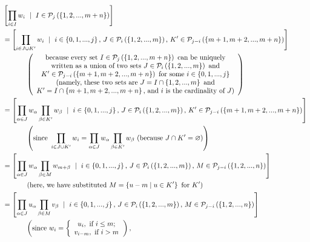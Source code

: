 \documentclass[numbers=enddot,12pt,final,onecolumn,notitlepage]{scrartcl}%
\begin{document}
\begin{align*}
&  \left[  \prod\limits_{i\in I}w_{i}\ \mid\ I\in\mathcal{P}_{j}\left(
\left\{  1,2,...,m+n\right\}  \right)  \right] \\
&  =\left[  \prod\limits_{i\in J\cup K^{\prime}}w_{i}\ \mid\ i\in\left\{
0,1,...,j\right\}  \text{, }J\in\mathcal{P}_{i}\left(  \left\{
1,2,...,m\right\}  \right)  \text{, }K^{\prime}\in\mathcal{P}_{j-i}\left(
\left\{  m+1,m+2,...,m+n\right\}  \right)  \right] \\
&  \ \ \ \ \ \ \ \ \ \ \left(
\begin{array}
[c]{c}%
\text{because every set }I\in\mathcal{P}_{j}\left(  \left\{
1,2,...,m+n\right\}  \right)  \text{ can be uniquely}\\
\text{written as a union of two sets }J\in\mathcal{P}_{i}\left(  \left\{
1,2,...,m\right\}  \right)  \text{ and}\\
K^{\prime}\in\mathcal{P}_{j-i}\left(  \left\{  m+1,m+2,...,m+n\right\}
\right)  \text{ for some }i\in\left\{  0,1,...,j\right\} \\
\text{(namely, these two sets are }J=I\cap\left\{  1,2,...,m\right\}  \text{
and}\\
K^{\prime}=I\cap\left\{  m+1,m+2,...,m+n\right\}  \text{, and }i\text{ is the
cardinality of }J\text{)}%
\end{array}
\right) \\
&  =\left[  \prod\limits_{\alpha\in J}w_{\alpha}\prod\limits_{\beta\in
K^{\prime}}w_{\beta}\ \mid\ i\in\left\{  0,1,...,j\right\}  \text{, }%
J\in\mathcal{P}_{i}\left(  \left\{  1,2,...,m\right\}  \right)  \text{,
}K^{\prime}\in\mathcal{P}_{j-i}\left(  \left\{  m+1,m+2,...,m+n\right\}
\right)  \right] \\
&  \ \ \ \ \ \ \ \ \ \ \left(  \text{since }\prod\limits_{i\in J\cup
K^{\prime}}w_{i}=\prod\limits_{\alpha\in J}w_{\alpha}\prod\limits_{\beta\in
K^{\prime}}w_{\beta}\text{ (because }J\cap K^{\prime}=\varnothing
\text{)}\right) \\
&  =\left[  \prod\limits_{\alpha\in J}w_{\alpha}\prod\limits_{\beta\in
M}w_{m+\beta}\ \mid\ i\in\left\{  0,1,...,j\right\}  \text{, }J\in
\mathcal{P}_{i}\left(  \left\{  1,2,...,m\right\}  \right)  \text{, }%
M\in\mathcal{P}_{j-i}\left(  \left\{  1,2,...,n\right\}  \right)  \right] \\
&  \ \ \ \ \ \ \ \ \ \ \left(  \text{here, we have substituted }M=\left\{
u-m\mid u\in K^{\prime}\right\}  \text{ for }K^{\prime}\right) \\
&  =\left[  \prod\limits_{\alpha\in J}u_{\alpha}\prod\limits_{\beta\in
M}v_{\beta}\ \mid\ i\in\left\{  0,1,...,j\right\}  \text{, }J\in
\mathcal{P}_{i}\left(  \left\{  1,2,...,m\right\}  \right)  \text{, }%
M\in\mathcal{P}_{j-i}\left(  \left\{  1,2,...,n\right\}  \right)  \right] \\
&  \ \ \ \ \ \ \ \ \ \ \left(  \text{since }w_{i}=\left\{
\begin{array}
[c]{c}%
u_{i},\text{ if }i\leq m;\\
v_{i-m},\text{ if }i>m
\end{array}
\right.  \right)  ,
\end{align*}
\end{document}

